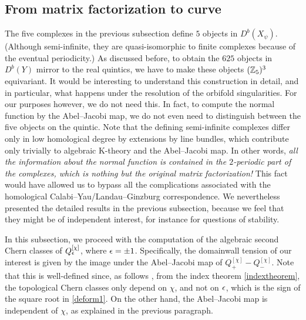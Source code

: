 \subsection{From matrix factorization to curve}

The five complexes in the previous subsection define $5$ objects in $D^b(X_\psi)$.
(Although semi-infinite, they are quasi-isomorphic to finite complexes
because of the eventual periodicity.) As discussed before, to obtain
the $625$ objects in $D^b(Y)$ mirror to the real quintics, we have to
make these objects $({\mathbb Z}_5)^3$ equivariant. It would be interesting to
understand this construction in detail, and in particular, what happens under
the resolution of the orbifold singularities. For our purposes however, 
we do not need this. In fact, to compute the normal function by
the Abel--Jacobi map, we do not even need to distinguish between the five
objects on the quintic. Note that the defining semi-infinite complexes 
differ only in low homological degree by extensions by line bundles, which
contribute only trivially to algebraic K-theory and the Abel--Jacobi map. 
In other words, {\it all the information about the normal function is 
contained in the $2$-periodic part of the complexes, which is nothing but 
the original matrix factorization!} This fact would have allowed us to 
bypass all the complications associated with the homological 
Calabi--Yau/Landau--Ginzburg correspondence. We nevertheless presented the 
detailed results in the previous subsection, because we feel that they might 
be of independent interest, for instance for questions of stability.

In this subsection, we proceed with the computation of the algebraic
second Chern classes of $Q_\epsilon^{[\chi]}$, where $\epsilon=\pm 1$. Specifically, the
domainwall tension of our interest is given by the image under the Abel--Jacobi 
map of $Q_+^{[\chi]}-Q_-^{[\chi]}$. Note that this is well-defined since, as 
follows \eg, from the index theorem \eqref{indextheorem}, the topological 
Chern classes only depend on $\chi$, and not on $\epsilon$, which is the sign
of the square root in \eqref{deform1}. On the other hand, the Abel--Jacobi
map is independent of $\chi$, as explained in the previous paragraph.

